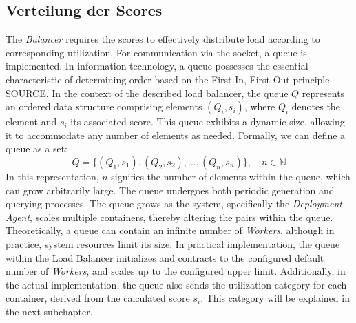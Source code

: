 \documentclass[twocolumn]{webofc}
\begin{document}
\subsection{Verteilung der Scores}
The \textit{Balancer} requires the scores to effectively distribute load according to corresponding utilization. For communication via the socket, a queue is implemented. In information technology, a queue possesses the essential characteristic of determining order based on the First In, First Out principle {\color{red} SOURCE}. In the context of the described load balancer, the queue \( Q \) represents an ordered data structure comprising elements \( (Q_i, s_i) \), where \( Q_i \) denotes the element and \( s_i \) its associated score. This queue exhibits a dynamic size, allowing it to accommodate any number of elements as needed. Formally, we can define a queue as a set:
$$Q = \{ (Q_1, s_1), (Q_2, s_2), \dots, (Q_n, s_n) \}, \quad n \in \mathbb{N}$$
In this representation, \( n \) signifies the number of elements within the queue, which can grow arbitrarily large. The queue undergoes both periodic generation and querying processes. The queue grows as the system, specifically the \textit{Deployment-Agent}, scales multiple containers, thereby altering the pairs within the queue. Theoretically, a queue can contain an infinite number of \textit{Workers}, although in practice, system resources limit its size. In practical implementation, the queue within the Load Balancer initializes and contracts to the configured default number of \textit{Workers}, and scales up to the configured upper limit. Additionally, in the actual implementation, the queue also sends the utilization category for each container, derived from the calculated score \( s_i \). This category will be explained in the next subchapter.
\end{document}

